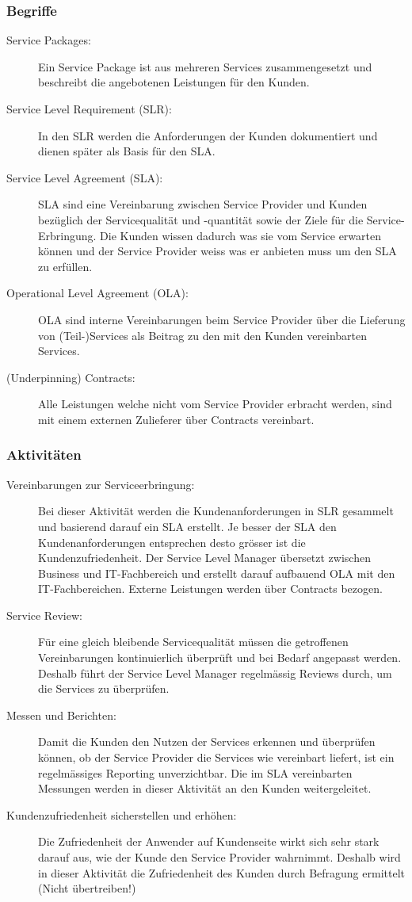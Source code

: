 \subsubsection{Begriffe}

\begin{description}
	\item[Service Packages:] Ein Service Package ist aus mehreren Services zusammengesetzt und beschreibt die angebotenen Leistungen für den Kunden.
	\item[Service Level Requirement (SLR):] In den SLR werden die Anforderungen der Kunden dokumentiert und dienen später als Basis für den SLA.
	\item[Service Level Agreement (SLA):] SLA sind eine Vereinbarung zwischen Service Provider und Kunden bezüglich der Servicequalität und -quantität sowie der Ziele für die Service-Erbringung. Die Kunden wissen dadurch was sie vom Service erwarten können und der Service Provider weiss was er anbieten muss um den SLA zu erfüllen.
	\item[Operational Level Agreement (OLA):] OLA sind interne Vereinbarungen beim Service Provider über die Lieferung von (Teil-)Services als Beitrag zu den mit den Kunden vereinbarten Services.
	\item[(Underpinning) Contracts:] Alle Leistungen welche nicht vom Service Provider erbracht werden, sind mit einem externen Zulieferer über Contracts vereinbart.
\end{description}

\subsubsection{Aktivitäten}

\begin{description}
	\item[Vereinbarungen zur Serviceerbringung:] Bei dieser Aktivität werden die Kundenanforderungen in SLR gesammelt und basierend darauf ein SLA erstellt. Je besser der SLA den Kundenanforderungen entsprechen desto grösser ist die Kundenzufriedenheit. Der Service Level Manager übersetzt zwischen Business und IT-Fachbereich und erstellt darauf aufbauend OLA mit den IT-Fachbereichen. Externe Leistungen werden über Contracts bezogen.
	\item[Service Review:] Für eine gleich bleibende Servicequalität müssen die getroffenen Vereinbarungen kontinuierlich
	überprüft und bei Bedarf angepasst werden. Deshalb führt der Service Level Manager regelmässig Reviews durch, um die Services zu überprüfen.
	\item[Messen und Berichten:] Damit die Kunden den Nutzen der Services erkennen und überprüfen können, ob der Service
	Provider die Services wie vereinbart liefert, ist ein regelmässiges Reporting unverzichtbar. Die im SLA vereinbarten Messungen werden in dieser Aktivität an den Kunden weitergeleitet.
	\item[Kundenzufriedenheit sicherstellen und erhöhen:] Die Zufriedenheit der Anwender auf Kundenseite wirkt sich sehr stark darauf aus, wie der Kunde den Service Provider wahrnimmt. Deshalb wird in dieser Aktivität die Zufriedenheit des Kunden durch Befragung ermittelt (Nicht übertreiben!)
\end{description}

